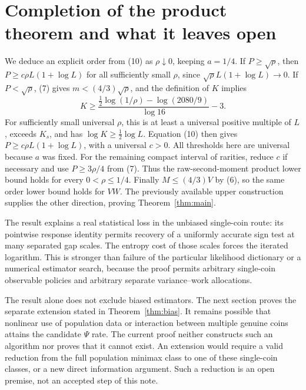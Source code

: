 \section{Completion of the product theorem and what it leaves open}
We deduce an explicit order from (10) as $\rho\downarrow0$, keeping $a=1/4$.
If $P\ge\sqrt\rho$, then $P\ge c\rho L(1+\log L)$ for all sufficiently small
$\rho$, since $\sqrt\rho L(1+\log L)\to0$.
If $P<\sqrt\rho$, (7) gives $m<(4/3)\sqrt\rho$, and the definition of $K$
implies
\[
 K\ge\frac{\tfrac12\log(1/\rho)-\log(2080/9)}{\log16}-3.
\]
For sufficiently small universal $\rho$, this is at least a universal positive
multiple of $L$, exceeds $K_s$, and has $\log K\ge\tfrac12\log L$.
Equation (10) then gives $P\ge c\rho L(1+\log L)$, with a universal $c>0$.
All thresholds here are universal because $a$ was fixed.
For the remaining compact interval of rarities, reduce $c$ if necessary and use
$P\ge3\rho/4$ from (7). Thus the raw-second-moment product lower bound holds
for every $0<\rho\le1/4$.
Finally $M\le(4/3)V$ by (6), so the same order lower bound holds for $VW$.
The previously available upper construction supplies the other direction,
proving Theorem~\ref{thm:main}.

The result explains a real statistical loss in the unbiased single-coin route:
its pointwise response identity permits recovery of a uniformly accurate sign
test at many separated gap scales. The entropy cost of those scales forces the
iterated logarithm. This is stronger than failure of the particular likelihood
dictionary or a numerical estimator search, because the proof permits arbitrary
single-coin observable policies and arbitrary separate variance--work allocations.

The result alone does not exclude biased estimators. The next section proves
the separate extension stated in Theorem~\ref{thm:bias}. It remains possible
that nonlinear use of population data or interaction between multiple genuine
coins attains the candidate
$\Psi$ rate. The current proof neither constructs such an algorithm nor proves
that it cannot exist. An extension would require a valid reduction from the
full population minimax class to one of these single-coin classes, or a new direct
information argument. Such a reduction is an open premise, not an accepted
step of this note.

